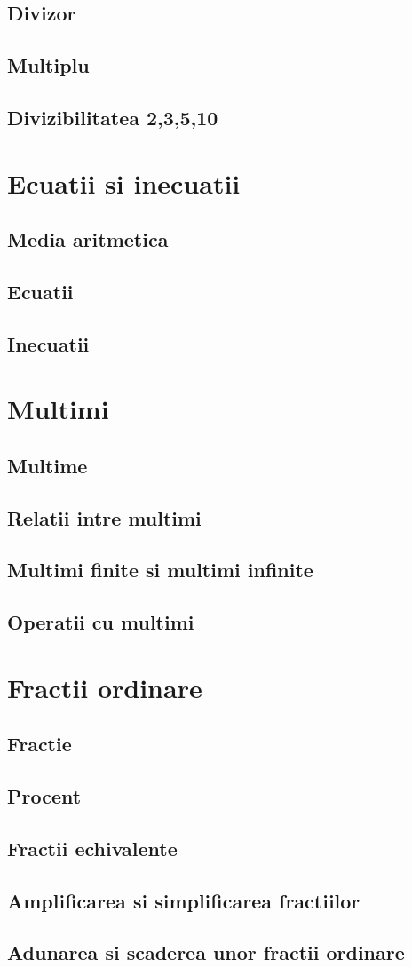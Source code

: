 \documentclass[a4paper,10pt]{article}
\begin{document}
	\subsection{Divizor}
	\subsection{Multiplu}
	\subsection{Divizibilitatea 2,3,5,10}
	\section{Ecuatii si inecuatii}
	\subsection{Media aritmetica}
	\subsection{Ecuatii}
	\subsection{Inecuatii}
	\section{Multimi}
	\subsection{Multime}
	\subsection{Relatii intre multimi}
	\subsection{Multimi finite si multimi infinite}
	\subsection{Operatii cu multimi}
	\section{Fractii ordinare}
	\subsection{Fractie}
	\subsection{Procent}
	\subsection{Fractii echivalente}
	\subsection{Amplificarea si simplificarea fractiilor}
	\subsection{Adunarea si scaderea unor fractii ordinare}
	
	
	
	
\end{document}

